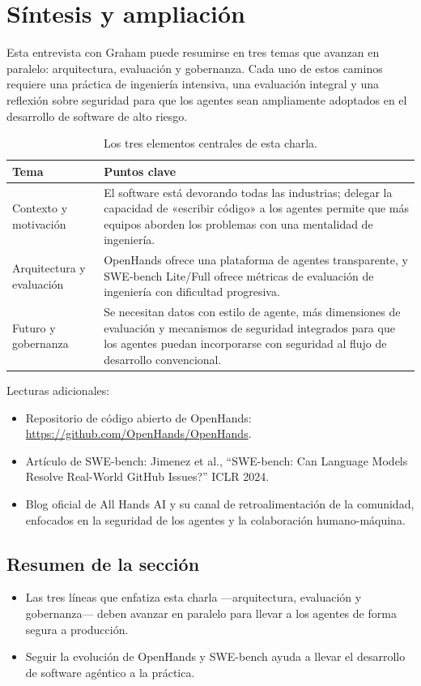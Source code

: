 \section{Síntesis y ampliación}
Esta entrevista con Graham puede resumirse en tres temas que avanzan en paralelo: arquitectura, evaluación y gobernanza. Cada uno de estos caminos requiere una práctica de ingeniería intensiva, una evaluación integral y una reflexión sobre seguridad para que los agentes sean ampliamente adoptados en el desarrollo de software de alto riesgo.

\begin{table}[H]
\centering
\begin{tabular}{p{} p{}}
\toprule
Tema & Puntos clave \\
\midrule
Contexto y motivación & El software está devorando todas las industrias; delegar la capacidad de «escribir código» a los agentes permite que más equipos aborden los problemas con una mentalidad de ingeniería. \\
\midrule
Arquitectura y evaluación & OpenHands ofrece una plataforma de agentes transparente, y SWE-bench Lite/Full ofrece métricas de evaluación de ingeniería con dificultad progresiva. \\
\midrule
Futuro y gobernanza & Se necesitan datos con estilo de agente, más dimensiones de evaluación y mecanismos de seguridad integrados para que los agentes puedan incorporarse con seguridad al flujo de desarrollo convencional. \\
\bottomrule
\end{tabular}
\caption{Los tres elementos centrales de esta charla.}
\end{table}

Lecturas adicionales:
\begin{itemize}
    \item Repositorio de código abierto de OpenHands: \href{https://github.com/OpenHands/OpenHands}{https://github.com/OpenHands/OpenHands}.
    \item Artículo de SWE-bench: Jimenez et al., ``SWE-bench: Can Language Models Resolve Real-World GitHub Issues?'' ICLR 2024.
    \item Blog oficial de All Hands AI y su canal de retroalimentación de la comunidad, enfocados en la seguridad de los agentes y la colaboración humano-máquina.
\end{itemize}

\subsection{Resumen de la sección}
\begin{itemize}
    \item Las tres líneas que enfatiza esta charla —arquitectura, evaluación y gobernanza— deben avanzar en paralelo para llevar a los agentes de forma segura a producción.
    \item Seguir la evolución de OpenHands y SWE-bench ayuda a llevar el desarrollo de software agéntico a la práctica.
\end{itemize}


